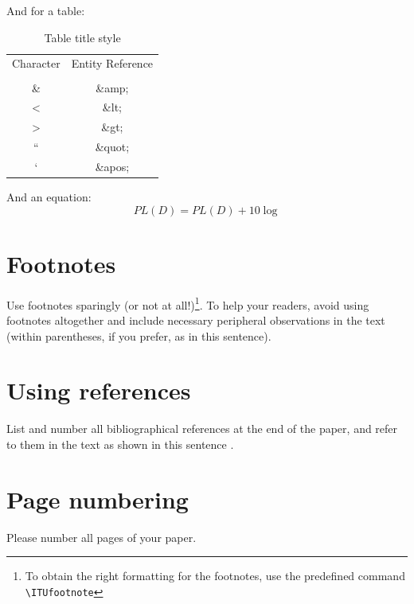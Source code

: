 \documentclass[10pt,a4paper,twocolumn]{article}
\newcommand{\ITUfootnote}[1]{\footnote{#1}}
\def\starttable{\vspace{6pt}\begin{table}[ht]\center}
\begin{document}
And for a table:
\starttable
\caption{Table title style}\label{tab:tab1} 
\begin{small}
\begin{tabu}{|c|c|}
\hline
 \rowfont{\bfseries}Character & Entity Reference\\ 
  & \\
\hline
\hline
\& & \&amp; \\
\hline
 < & \&lt;\\
 \hline
 > & \&gt; \\
\hline
``  & \&quot; \\
\hline
 ` & \&apos; \\
\hline
\end{tabu}
\end{small}
\end{table}

And an equation:
\begin{equation}\label{eq:eq1}
PL(D)=PL(D)+10\log 
\end{equation}



\section{Footnotes}
\label{sec:sec7}
Use footnotes sparingly (or not at all!)\ITUfootnote{To obtain the right formatting for the footnotes, use the predefined command \texttt{\textbackslash{ITUfootnote}}}.
To help your readers, avoid using footnotes altogether and include necessary peripheral observations in the text (within parentheses, if you prefer, as in this sentence).


\section{Using references}
\label{sec:sec8}
List and number all bibliographical references at the end of the paper, and refer to them in the text as shown in this sentence \cite{author2021}.


\section{Page numbering}
\label{sec:sec9}
Please number all pages of your paper.
\end{document}
